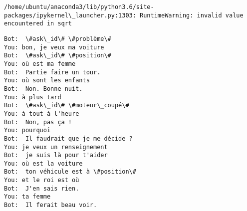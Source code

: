 \documentclass[11pt]{article}
\begin{document}
    \begin{Verbatim}[commandchars=\\\{\}]
/home/ubuntu/anaconda3/lib/python3.6/site-packages/ipykernel\_launcher.py:1303: RuntimeWarning: invalid value encountered in sqrt

    \end{Verbatim}

    \begin{Verbatim}[commandchars=\\\{\}]
Bot:  \#ask\_id\# \#problème\#
You: bon, je veux ma voiture
Bot:  \#ask\_id\# \#position\#
You: où est ma femme
Bot:  Partie faire un tour.
You: où sont les enfants
Bot:  Non. Bonne nuit.
You: à plus tard
Bot:  \#ask\_id\# \#moteur\_coupé\#
You: à tout à l'heure
Bot:  Non, pas ça !
You: pourquoi
Bot:  Il faudrait que je me décide ?
You: je veux un renseignement
Bot:  je suis là pour t'aider
You: où est la voiture
Bot:  ton véhicule est à \#position\#
You: et le roi est où
Bot:  J'en sais rien.
You: ta femme
Bot:  Il ferait beau voir.

    \end{Verbatim}


    
    
    
    
\end{document}
